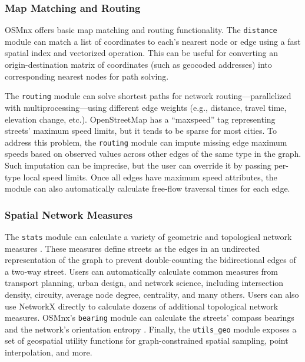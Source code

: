 \documentclass[12pt,letterpaper]{article} %
\begin{document}
\subsubsection{Map Matching and Routing}

OSMnx offers basic map matching and routing functionality. The \texttt{distance} module can match a list of coordinates to each's nearest node or edge using a fast spatial index and vectorized operation. This can be useful for converting an origin-destination matrix of coordinates (such as geocoded addresses) into corresponding nearest nodes for path solving.

The \texttt{routing} module can solve shortest paths for network routing---parallelized with multiprocessing---using different edge weights (e.g., distance, travel time, elevation change, etc.). OpenStreetMap has a \enquote{maxspeed} tag representing streets' maximum speed limits, but it tends to be sparse for most cities. To address this problem, the \texttt{routing} module can impute missing edge maximum speeds based on observed values across other edges of the same type in the graph. Such imputation can be imprecise, but the user can override it by passing per-type local speed limits. Once all edges have maximum speed attributes, the module can also automatically calculate free-flow traversal times for each edge.

\subsubsection{Spatial Network Measures}

The \texttt{stats} module can calculate a variety of geometric and topological network measures \citep{boeing_street_2022}. These measures define streets as the edges in an undirected representation of the graph to prevent double-counting the bidirectional edges of a two-way street. Users can automatically calculate common measures from transport planning, urban design, and network science, including intersection density, circuity, average node degree, centrality, and many others. Users can also use NetworkX directly to calculate dozens of additional topological network measures. OSMnx's \texttt{bearing} module can calculate the streets' compass bearings and the network's orientation entropy \citep{boeing_urban_2019}. Finally, the \texttt{utils\_geo} module exposes a set of geospatial utility functions for graph-constrained spatial sampling, point interpolation, and more.
\end{document}
